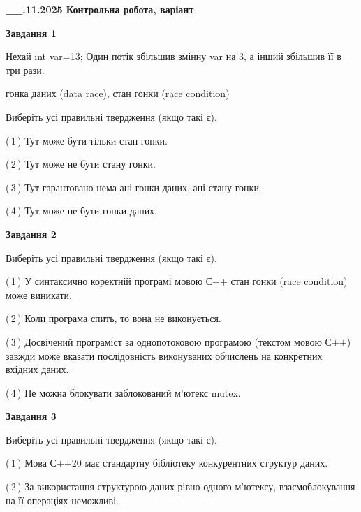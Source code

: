 \documentclass[12pt, ukrainian]{article}
\begin{document}
\begin {large}

\textbf{\_\_.11.2025 Контрольна робота, варіант  }\par


{

\begin{center}
\textbf{Завдання 1}
\end{center}
Нехай int var=13; Один потік збільшив змінну var на 3, а інший збільшив її в три рази.

гонка даних (data race), стан гонки (race condition)

Виберіть усі правильні твердження (якщо такі є).\par
\vspace{2mm}
(\,1\,) Тут може бути тільки стан гонки.%

(\,2\,) Тут може не бути стану гонки.%

(\,3\,) Тут гарантовано нема ані гонки даних, ані стану гонки.%

(\,4\,) Тут може не бути гонки даних.%



\begin{center}
\textbf{Завдання 2}
\end{center}
Виберіть усі правильні твердження (якщо такі є).\par
\vspace{2mm}

(\,1\,) У синтаксично коректній програмі мовою С++ стан гонки (race condition) може виникати.%

(\,2\,) Коли програма спить, то вона не виконується.%

(\,3\,) Досвічений програміст за однопотоковою програмою (текстом мовою С++) завжди може вказати послідовність виконуваних обчислень на конкретних вхідних даних.%

(\,4\,) Не можна блокувати заблокований м’ютекс mutex.%



\begin{center}
\textbf{Завдання 3}
\end{center}
Виберіть усі правильні твердження (якщо такі є).\par
\vspace{2mm}

(\,1\,) Мова С++20 має стандартну бібліотеку конкурентних структур даних.%

(\,2\,) За використання структурою даних рівно одного м’ютексу, взаємоблокування на її операціях неможливі.%

}
\end{large}
\end{document}
